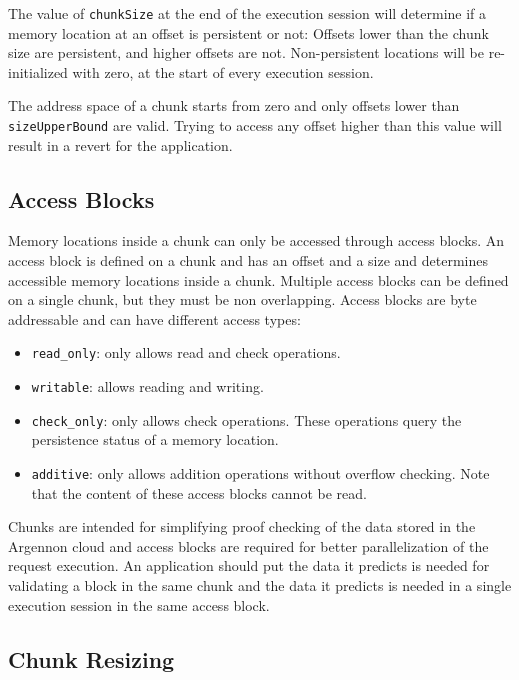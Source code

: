 The value of \texttt{chunkSize} at the end of the execution session will determine if a memory location at an
offset is persistent or not: Offsets lower than the chunk size are persistent, and higher offsets are not.
Non-persistent locations will be re-initialized with zero, at the start of every execution session.

The address space of a chunk starts from zero and only offsets lower than \texttt{sizeUpperBound} are valid. Trying to
access any offset higher than this value will result in a revert for the application.

\subsection{Access Blocks}\label{subsec:access-blocks}

Memory locations inside a chunk can only be accessed through access blocks. An access block is defined on a chunk
and has an offset and a size and determines accessible memory locations inside a chunk. Multiple access blocks can
be defined on a single chunk, but they must be non overlapping. Access blocks are byte addressable and can have
different
access types:

\begin{itemize}
    \item \texttt{read\_only}: only allows read and check operations.
    \item \texttt{writable}: allows reading and writing.
    \item \texttt{check\_only}: only allows check operations. These operations query the persistence
    status of a memory location.
    \item \texttt{additive}: only allows addition operations without overflow checking. Note that the content of these
    access blocks cannot be read.
\end{itemize}

Chunks are intended for simplifying proof checking of the data stored in the Argennon cloud and access blocks are
required for better parallelization of the request execution. An application should put the data it predicts is
needed for validating a block in the same chunk and the data it predicts is needed in a single execution
session in the same access block.

\subsection{Chunk Resizing}\label{subsec:ch-resize}


